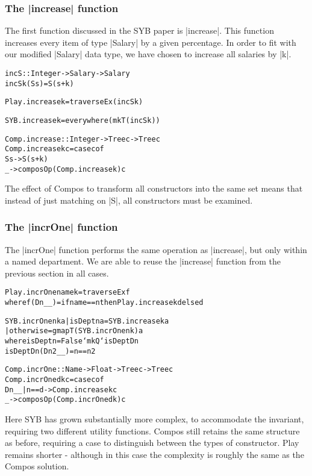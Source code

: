 \documentclass[preprint]{sigplanconf}
\newenvironment{code}{\begin{alltt}\small}{\end{alltt}}
\begin{document}
\subsubsection{The |increase| function}

The first function discussed in the SYB paper is |increase|. This function increases every item of type |Salary| by a given percentage. In order to fit with our modified |Salary| data type, we have chosen to increase all salaries by |k|.

\begin{code}
incS :: Integer -> Salary -> Salary
incS k (S s) = S (s + k)

Play.increase k = traverseEx (incS k)

SYB.increase k = everywhere (mkT (incS k))

Comp.increase :: Integer -> Tree c -> Tree c
Comp.increase k c = case c of
    S s -> S (s + k)
    _ -> composOp (Comp.increase k) c
\end{code}

The effect of Compos to transform all constructors into the same set means that instead of just matching on |S|, all constructors must be examined.

\subsubsection{The |incrOne| function}

The |incrOne| function performs the same operation as |increase|, but only within a named department. We are able to reuse the |increase| function from the previous section in all cases.

\begin{code}
Play.incrOne name k = traverseEx f
    where f (D n _ _) = if name == n then Play.increase k d else d

SYB.incrOne n k a  | isDept n a  = SYB.increase k a
                   | otherwise   = gmapT (SYB.incrOne n k) a
    where  isDept n = False `mkQ` isDeptD n
           isDeptD n (D n2 _ _) = n == n2

Comp.incrOne :: Name -> Float -> Tree c -> Tree c
Comp.incrOne d k c = case c of
    D n _ _ | n == d -> Comp.increase k c
    _ -> composOp (Comp.incrOne d k) c
\end{code}

Here SYB has grown substantially more complex, to accommodate the invariant, requiring two different utility functions. Compos still retains the same structure as before, requiring a case to distinguish between the types of constructor. Play remains shorter - although in this case the complexity is roughly the same as the Compos solution.
\end{document}
